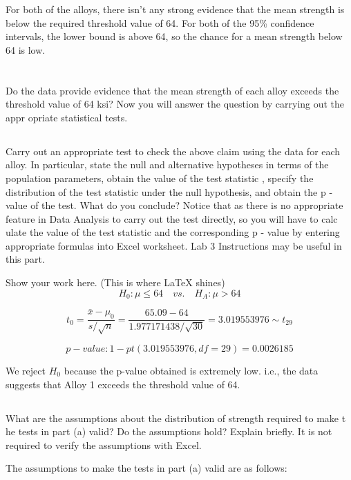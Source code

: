 \documentclass[letterpaper]{article}
\begin{document}
For both of the alloys, there isn't any strong evidence that the mean strength
is below the required threshold value of 64. For both of the 95\% confidence
intervals, the lower bound is above 64, so the chance for a mean strength below
64 is low.

\section{}%
Do the data provide evidence that the mean strength of each alloy exceeds the
threshold value of 64 ksi?  Now you will answer the question by carrying out the
appr opriate statistical tests.
\subsection{}%
Carry out an appropriate test to check the above claim using the data for each
alloy. In particular, state  the null and alternative hypotheses in terms of the
population parameters, obtain the value of the test  statistic , specify the
distribution of the test statistic under the null hypothesis, and obtain the  p
- value of  the test. What do you conclude? Notice that as there is no
appropriate feature in  Data Analysis to  carry out the test directly,  so  you
will have to calc ulate the value of the test statistic and the  corresponding
p - value by entering appropriate formulas into Excel worksheet.  Lab 3
Instructions may  be useful in this part.

Show your work here. (This is where \LaTeX{} shines)
$$H_0: \mu \leq 64 \quad vs. \quad H_A: \mu > 64 $$

$$t_0 = \frac{\bar{x}-\mu_0}{s/\sqrt{n}} = \frac{65.09 - 64}{1.977171438/\sqrt{30}} =  3.019553976 \sim t_{29}$$

$$ {p-value}: 1-pt(3.019553976, df=29) = 0.0026185 $$

We reject $H_0$ because the p-value obtained is extremely low. i.e., the data
suggests that Alloy 1 exceeds the threshold value of 64.


\subsection{}%
What are the assumptions about the distribution of strength required to make t
he tests in part (a) valid?  Do the assumptions hold? Explain briefly. It is not
required to verify the assumptions with Excel.

The assumptions to make the tests in part (a) valid are as follows:
\end{document}
